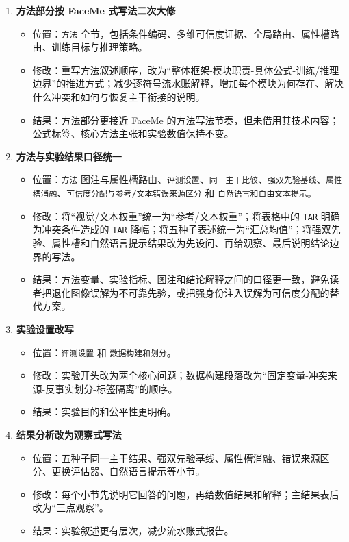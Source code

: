 \documentclass[UTF8,a4paper,zihao=-4]{ctexart}
\begin{document}
\begin{enumerate}
  \item \textbf{方法部分按 FaceMe 式写法二次大修}
  \begin{itemize}
    \item 位置：\texttt{方法} 全节，包括条件编码、多维可信度证据、全局路由、属性槽路由、训练目标与推理策略。
    \item 修改：重写方法叙述顺序，改为“整体框架-模块职责-具体公式-训练/推理边界”的推进方式；减少逐符号流水账解释，增加每个模块为何存在、解决什么冲突和如何与恢复主干衔接的说明。
    \item 结果：方法部分更接近 FaceMe 的方法写法节奏，但未借用其技术内容；公式标签、核心方法主张和实验数值保持不变。
  \end{itemize}

  \item \textbf{方法与实验结果口径统一}
  \begin{itemize}
    \item 位置：\texttt{方法} 图注与属性槽路由、\texttt{评测设置}、\texttt{同一主干比较}、\texttt{强双先验基线}、\texttt{属性槽消融}、\texttt{可信度分配与参考/文本错误来源区分} 和 \texttt{自然语言和自由文本提示}。
    \item 修改：将“视觉/文本权重”统一为“参考/文本权重”；将表格中的 \texttt{TAR} 明确为冲突条件造成的 \texttt{TAR} 降幅；将五种子表述统一为“汇总均值”；将强双先验、属性槽和自然语言提示结果改为先设问、再给观察、最后说明结论边界的写法。
    \item 结果：方法变量、实验指标、图注和结论解释之间的口径更一致，避免读者把退化图像误解为不可靠先验，或把强身份注入误解为可信度分配的替代方案。
  \end{itemize}

  \item \textbf{实验设置改写}
  \begin{itemize}
    \item 位置：\texttt{评测设置} 和 \texttt{数据构建和划分}。
    \item 修改：实验开头改为两个核心问题；数据构建段落改为“固定变量-冲突来源-反事实划分-标签隔离”的顺序。
    \item 结果：实验目的和公平性更明确。
  \end{itemize}

  \item \textbf{结果分析改为观察式写法}
  \begin{itemize}
    \item 位置：五种子同一主干结果、强双先验基线、属性槽消融、错误来源区分、更换评估器、自然语言提示等小节。
    \item 修改：每个小节先说明它回答的问题，再给数值结果和解释；主结果表后改为“三点观察”。
    \item 结果：实验叙述更有层次，减少流水账式报告。
  \end{itemize}


\end{enumerate}
\end{document}
